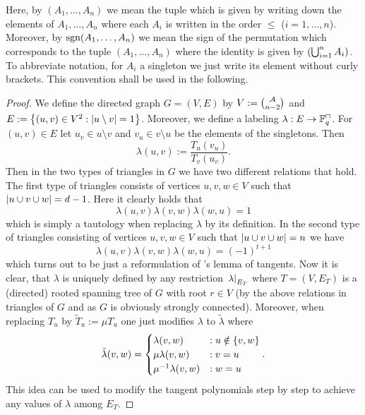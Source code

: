 \begin{remark}
    Here, by $(A_1,\ldots,A_n)$ we mean the tuple
    which is given by writing down the elements of $A_1,\ldots,A_n$
    where each $A_i$ is written in the order $\leq$
    ($i=1,\ldots,n$). Moreover, by $\mathop\mathrm{sgn}(A_1,\ldots,A_n)$ we mean
    the sign of the permutation which corresponds to the tuple $(A_1,\ldots,A_n)$
    where the identity is given by $(\bigcup_{i=1}^n{A_i})$. To abbreviate notation, for $A_i$ a singleton we just write its
    element without curly brackets.  
    This convention shall be used in the following.
\end{remark}

\begin{proof}
    We define the directed graph $G=(V,E)$ by $V:=\binom{\cA}{n-2}$ and $E:=\left\{(u,v)\in V^2:\left|u\setminus v\right|=1\right\}$.
    Moreover, we define a labeling $\lambda:E\to \units{\field{q}}$. For $(u,v)\in E$ let $u_v\in u\setminus v$ and $v_u\in v\setminus u$ be the elements of the singletons. Then 
    $$
    \lambda(u,v):=\frac{T_u(v_u)}{T_v(u_v)}\text{.} 
    $$
    Then in the two types of triangles in $G$ we have two different relations that hold.
    The first type of triangles consists of vertices $u,v,w\in V$ such that $\left|u\cup v\cup w\right|=d-1$.
    Here it clearly holds that
    $$
    \lambda(u,v)\lambda(v,w)\lambda(w,u)=1
    $$
    which is simply a tautology when replacing $\lambda$ by its definition.
    In the second type of triangles consisting of vertices $u,v,w\in V$ such that $\left|u\cup v\cup w\right|=n$ we have
    $$
    \lambda(u,v)\lambda(v,w)\lambda(w,u)={(-1)}^{t+1}
    $$
    which turns out to be just a reformulation of 's lemma of tangents.
    Now it is clear, that $\lambda$ is uniquely defined by any restriction $\left. \lambda\right\vert_{E_T}$ where $T=(V,E_T)$ is a (directed) rooted spanning tree of $G$ with root $r\in V$ (by the above relations in triangles of $G$ and as $G$ is obviously strongly connected).
    Moreover, when replacing $T_u$ by $\tilde{T}_u:=\mu T_u$ one just modifies $\lambda$ to $\tilde{\lambda}$ where 
    $$
    \tilde{\lambda}(v,w)=
    \begin{cases} 
        \lambda(v,w) & : u\notin\left\{v,w\right\}\\
        \mu\lambda(v,w) &: v=u\\
        \mu^{-1}\lambda(v,w) &: w=u
    \end{cases}\text{.}
    $$
    This idea can be used to modify the tangent polynomials step by step to achieve any values of $\lambda$ among $E_T$.

\end{proof}

